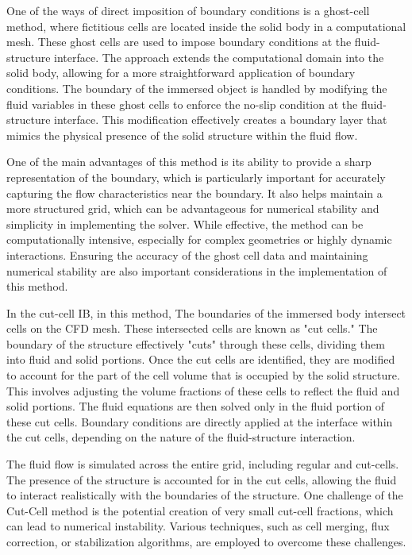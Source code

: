 One of the ways of direct imposition of boundary conditions is a ghost-cell method, where fictitious cells are located inside the solid body in a computational mesh. These ghost cells are used to impose boundary conditions at the fluid-structure interface. The approach extends the computational domain into the solid body, allowing for a more straightforward application of boundary conditions. The boundary of the immersed object is handled by modifying the fluid variables in these ghost cells to enforce the no-slip condition at the fluid-structure interface. This modification effectively creates a boundary layer that mimics the physical presence of the solid structure within the fluid flow. 

One of the main advantages of this method is its ability to provide a sharp representation of the boundary, which is particularly important for accurately capturing the flow characteristics near the boundary. It also helps maintain a more structured grid, which can be advantageous for numerical stability and simplicity in implementing the solver. While effective, the method can be computationally intensive, especially for complex geometries or highly dynamic interactions. Ensuring the accuracy of the ghost cell data and maintaining numerical stability are also important considerations in the implementation of this method.

In the cut-cell IB, in this method, The boundaries of the immersed body intersect cells on the CFD mesh. These intersected cells are known as "cut cells." The boundary of the structure effectively "cuts" through these cells, dividing them into fluid and solid portions. Once the cut cells are identified, they are modified to account for the part of the cell volume that is occupied by the solid structure. This involves adjusting the volume fractions of these cells to reflect the fluid and solid portions. The fluid equations are then solved only in the fluid portion of these cut cells. Boundary conditions are directly applied at the interface within the cut cells, depending on the nature of the fluid-structure interaction.

The fluid flow is simulated across the entire grid, including regular and cut-cells. The presence of the structure is accounted for in the cut cells, allowing the fluid to interact realistically with the boundaries of the structure. One challenge of the Cut-Cell method is the potential creation of very small cut-cell fractions, which can lead to numerical instability. Various techniques, such as cell merging, flux correction, or stabilization algorithms, are employed to overcome these challenges. 

